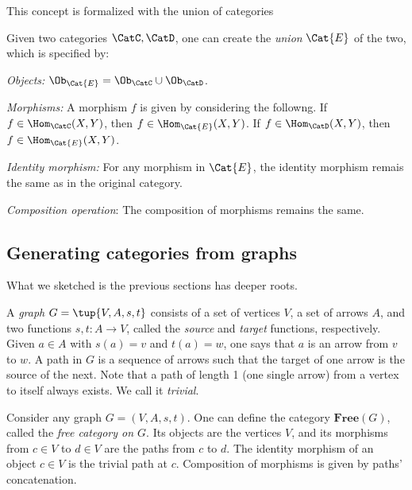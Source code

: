 

This concept is formalized with the union of categories
\begin{shaded}
\begin{definition}
Given two categories $\CatC,\CatD$, one can create the \emph{union} $\Cat{E}$ of the two, which is specified by:
\begin{compactenum}
\item \emph{Objects:} $\Ob_\Cat{E}=\Ob_\CatC \cup \Ob_\CatD$.
\item \emph{Morphisms:} A morphism $f$ is given by considering the followng. If $f\in \Hom_\CatC(X,Y)$, then $f\in \Hom_\Cat{E}(X,Y)$. If $f\in \Hom_\CatD(X,Y)$, then $f\in \Hom_\Cat{E}(X,Y)$.
\item \emph{Identity morphism:} For any morphism in $\Cat{E}$, the identity morphism remais the same as in the original category.
\item \emph{Composition operation}: The composition of morphisms remains the same.
\end{compactenum}
\end{definition}
\end{shaded}

\subsection{Generating categories from graphs}
What we sketched is the previous sections has deeper roots.
\begin{definition}[Graph]
A \emph{graph} $G=\tup{V,A,s,t}$ consists of a set of vertices $V$, a set of arrows $A$, and two functions $s,t\colon A\to V$, called the \emph{source} and \emph{target} functions, respectively. Given $a\in A$ with $s(a)=v$ and $t(a)=w$, one says that $a$ is an arrow from $v$ to $w$. A path in $G$ is a sequence of arrows such that the target of one arrow is the source of the next. Note that a path of length 1 (one single arrow) from a vertex to itself always exists. We call it \emph{trivial}.
\end{definition}

\begin{shaded}
\begin{definition}
Consider any graph $G=(V,A,s,t)$. One can define the category $\mathbf{Free}(G)$, called the \emph{free category on $G$}. Its objects are the vertices $V$, and its morphisms from $c\in V$ to $d\in V$ are the paths from $c$ to $d$. The identity morphism of an object $c\in V$ is the trivial path at $c$. Composition of morphisms is given by paths' concatenation.
\end{definition}
\end{shaded}


